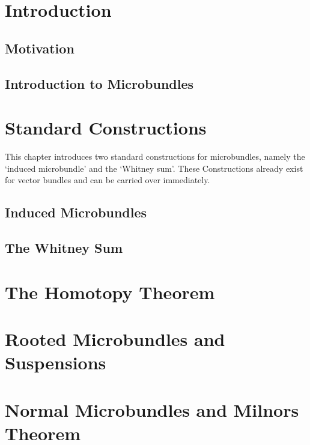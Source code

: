 \documentclass{report}
\begin{document}


\tableofcontents
\clearpage
\chapter{Introduction}\label{chapter::introduction}
\section{Motivation}\label{section::motivation}

\section{Introduction to Microbundles}\label{section::microbundle}

\chapter{Standard Constructions}\label{chapter::constructions}
\begin{myparagraph}
    This chapter introduces two standard constructions for microbundles,
    namely the `induced microbundle' and the `Whitney sum'.
    These Constructions already exist for vector bundles and can be carried over immediately.
\end{myparagraph}
\section{Induced Microbundles}\label{section::induced}

\section{The Whitney Sum}\label{section::whitney}

\chapter{The Homotopy Theorem}\label{chapter::homotopy}

\chapter{Rooted Microbundles and Suspensions}\label{chapter::suspension}

\chapter{Normal Microbundles and Milnors Theorem}\label{chapter::normal}


\end{document}
